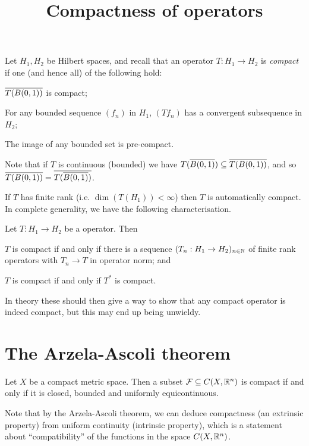 \documentclass[11pt]{article}
\title{Compactness of operators}
\renewcommand{\F}{\mathcal{F}}
\begin{document}
\maketitle
Let $H_1, H_2$ be Hilbert spaces, and recall that an operator $T : H_1 \to H_2$ is \emph{compact} if one (and hence all) of the following hold:
\begin{enum}
    \item $\overline{T(B(0, 1))}$ is compact;
    \item For any bounded sequence $(f_n)$ in $H_1$, $(Tf_n)$ has a convergent subsequence in $H_2$;
    \item The image of any bounded set is pre-compact.
\end{enum}
Note that if $T$ is continuous (bounded) we have $T(\overline{B(0, 1)}) \subseteq \overline{T(B(0, 1))}$, and so $\overline{T(B(0, 1))} = \overline{T(\overline{B(0, 1)})}$.

If $T$ has finite rank (i.e. $\dim(T(H_1)) < \infty$) then $T$ is automatically compact. In complete generality, we have the following characterisation.
\begin{theorem}
    Let $T : H_1 \to H_2$ be a operator. Then 
    \begin{enum}
        \item $T$ is compact if and only if there is a sequence $(T_n : H_1 \to H_2)_{n \in \mathbb{N}}$ of finite rank operators with $T_n \to T$ in operator norm; and
        \item $T$ is compact if and only if $T^*$ is compact.
    \end{enum}
\end{theorem}
In theory these should then give a way to show that any compact operator is indeed compact, but this may end up being unwieldy.
\section*{The Arzela-Ascoli theorem}
\begin{theorem}
    Let $X$ be a compact metric space. Then a subset $\F \subseteq C(X, \R^n)$ is compact if and only if it is closed, bounded and uniformly equicontinuous.
\end{theorem}
Note that by the Arzela-Ascoli theorem, we can deduce compactness (an extrinsic property) from uniform continuity (intrinsic property), which is a statement about ``compatibility'' of the functions in the space $C(X, \mathbb{R}^n)$.
\end{document}
